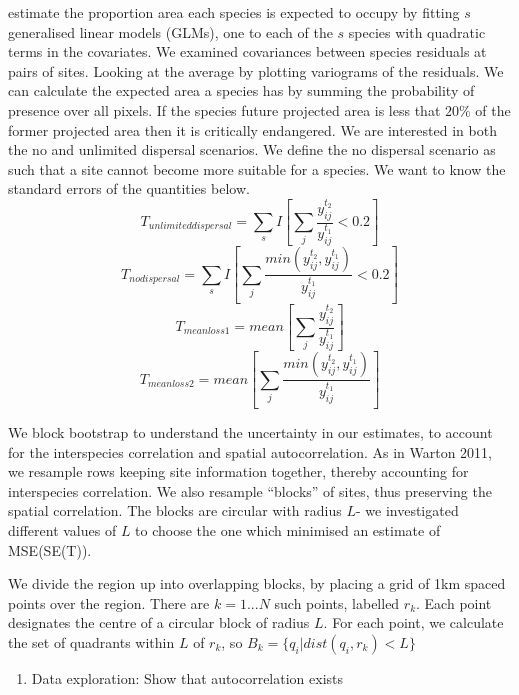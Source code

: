 \documentclass[a4paper,12pt]{article}
\begin{document}
estimate the proportion area each species is expected to occupy by fitting $s$ generalised linear models (GLMs), one to each of the $s$ species with quadratic terms in the covariates. We examined covariances between species residuals at pairs of sites. Looking at the average 
 by plotting variograms of the residuals. 
We can calculate the expected area a species has by summing the probability of presence over all pixels. If the species future projected area is less that $20\%$ of the former projected area then it is critically endangered. We are interested in both the no and unlimited dispersal scenarios. We define the no dispersal scenario as such that a site cannot become more suitable for a species. We want to know the standard errors of the quantities below. 
\[T_{unlimited dispersal}=\sum_sI[\sum_{j}\frac{y_{ij}^{t_2}}{y_{ij}^{t_1}}<0.2]\]
\[T_{no dispersal}=\sum_sI[\sum_{j}\frac{min(y_{ij}^{t_2},y_{ij}^{t_1})}{y_{ij}^{t_1}}<0.2]\]
\[T_{meanloss1}=mean[\sum_{j}\frac{y_{ij}^{t_2}}{y_{ij}^{t_1}}]\]
\[T_{meanloss2}=mean[\sum_{j}\frac{min(y_{ij}^{t_2},y_{ij}^{t_1})}{y_{ij}^{t_1}}]\]

We block bootstrap to understand the uncertainty in our estimates, to account for the interspecies correlation and spatial autocorrelation. As in Warton 2011, we resample rows keeping site information together, thereby accounting for interspecies correlation. We also resample ``blocks'' of sites, thus preserving the spatial correlation. The blocks are circular with radius $L$- we investigated different values of $L$ to choose the one which minimised an estimate of MSE(SE(T)). 

We divide the region up into overlapping blocks, by placing a grid of 1km spaced points over the region. There are $k=1...N$ such points, labelled $r_k$. Each point designates the centre of a circular block of radius $L$. For each point, we calculate the set of quadrants within $L$ of $r_k$, so $B_k=\{q_i|dist(q_i,r_k)<L\}$


\begin{enumerate}
\item Data exploration: Show that autocorrelation exists
\end{enumerate}
\end{document}
